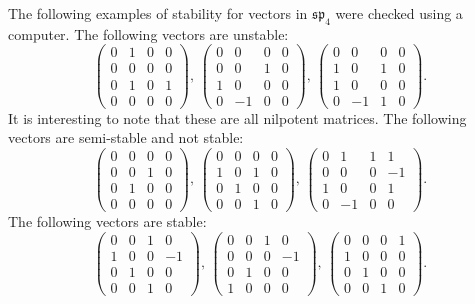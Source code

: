 \begin{example}
The following examples of stability for vectors in $\mathfrak{sp}_4$ were checked using a computer.
The following vectors are unstable:
$$
\begin{pmatrix} 
	0 & 1 & 0 & 0 \\ 
	0 & 0 & 0 & 0 \\
	0 & 1 & 0 & 1 \\
	0 & 0 & 0 & 0
\end{pmatrix}, \, 
\begin{pmatrix} 
	0 & 0 & 0 & 0 \\ 
	0 & 0 & 1 & 0 \\
	1 & 0 & 0 & 0 \\
	0 & -1 & 0 & 0
\end{pmatrix}, \, 
\begin{pmatrix} 
	0 & 0 & 0 & 0 \\ 
	1 & 0 & 1 & 0 \\
	1 & 0 & 0 & 0 \\
	0 & -1 & 1 & 0
\end{pmatrix}.
$$
It is interesting to note that these are all nilpotent matrices.
The following vectors are semi-stable and not stable:
$$
\begin{pmatrix} 
	0 & 0 & 0 & 0 \\ 
	0 & 0 & 1 & 0 \\
	0 & 1 & 0 & 0 \\
	0 & 0 & 0 & 0
\end{pmatrix}, \, 
\begin{pmatrix} 
	0 & 0 & 0 & 0 \\ 
	1 & 0 & 1 & 0 \\
	0 & 1 & 0 & 0 \\
	0 & 0 & 1 & 0
\end{pmatrix}, \, 
\begin{pmatrix} 
	0 & 1 & 1 & 1 \\ 
	0 & 0 & 0 & -1 \\
	1 & 0 & 0 & 1 \\
	0 & -1 & 0 & 0
\end{pmatrix}.
$$
The following vectors are stable:
$$
\begin{pmatrix} 
	0 & 0 & 1 & 0 \\ 
	1 & 0 & 0 & -1 \\
	0 & 1 & 0 & 0 \\
	0 & 0 & 1 & 0
\end{pmatrix}, \,
\begin{pmatrix} 
	0 & 0 & 1 & 0 \\ 
	0 & 0 & 0 & -1 \\
	0 & 1 & 0 & 0 \\
	1 & 0 & 0 & 0
\end{pmatrix}, \, 
\begin{pmatrix} 
	0 & 0 & 0 & 1 \\ 
	1 & 0 & 0 & 0 \\
	0 & 1 & 0 & 0 \\
	0 & 0 & 1 & 0
\end{pmatrix}.
$$ 
\end{example}
